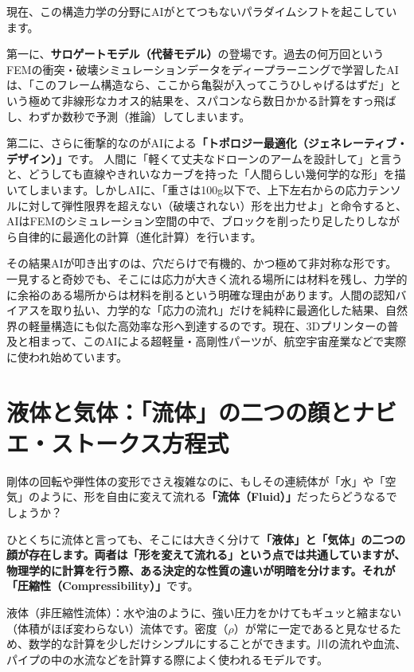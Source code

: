 現在、この構造力学の分野にAIがとてつもないパラダイムシフトを起こしています。

第一に、\textbf{サロゲートモデル（代替モデル）}の登場です。過去の何万回というFEMの衝突・破壊シミュレーションデータをディープラーニングで学習したAIは、「このフレーム構造なら、ここから亀裂が入ってこうひしゃげるはずだ」という極めて非線形なカオス的結果を、スパコンなら数日かかる計算をすっ飛ばし、わずか数秒で予測（推論）してしまいます。

第二に、さらに衝撃的なのがAIによる\textbf{「トポロジー最適化（ジェネレーティブ・デザイン）」}です。 人間に「軽くて丈夫なドローンのアームを設計して」と言うと、どうしても直線やきれいなカーブを持った「人間らしい幾何学的な形」を描いてしまいます。しかしAIに、「重さは100g以下で、上下左右からの応力テンソルに対して弾性限界を超えない（破壊されない）形を出力せよ」と命令すると、AIはFEMのシミュレーション空間の中で、ブロックを削ったり足したりしながら自律的に最適化の計算（進化計算）を行います。

その結果AIが叩き出すのは、穴だらけで有機的、かつ極めて非対称な形です。一見すると奇妙でも、そこには応力が大きく流れる場所には材料を残し、力学的に余裕のある場所からは材料を削るという明確な理由があります。人間の認知バイアスを取り払い、力学的な「応力の流れ」だけを純粋に最適化した結果、自然界の軽量構造にも似た高効率な形へ到達するのです。現在、3Dプリンターの普及と相まって、このAIによる超軽量・高剛性パーツが、航空宇宙産業などで実際に使われ始めています。

\section{液体と気体：「流体」の二つの顔とナビエ・ストークス方程式}

剛体の回転や弾性体の変形でさえ複雑なのに、もしその連続体が「水」や「空気」のように、形を自由に変えて流れる\textbf{「流体（Fluid）」}だったらどうなるでしょうか？

ひとくちに流体と言っても、そこには大きく分けて\textbf{「液体」と「気体」の二つの顔が存在します。両者は「形を変えて流れる」という点では共通していますが、物理学的に計算を行う際、ある決定的な性質の違いが明暗を分けます。それが「圧縮性（Compressibility）」}です。

液体（非圧縮性流体）：水や油のように、強い圧力をかけてもギュッと縮まない（体積がほぼ変わらない）流体です。密度（\ensuremath{\rho}）が常に一定であると見なせるため、数学的な計算を少しだけシンプルにすることができます。川の流れや血流、パイプの中の水流などを計算する際によく使われるモデルです。

